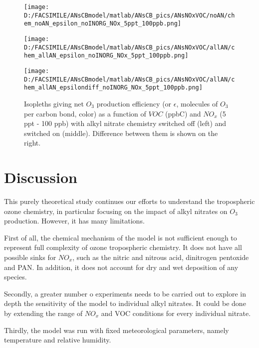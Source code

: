 \documentclass[11pt,a4paper]{article}
\begin{document}
\begin{figure} %
\centering
\begin{minipage}{.3\textwidth}
  \centering
  \texttt{[image: D:/FACSIMILE/ANsCBmodel/matlab/ANsCB\_pics/ANsNOxVOC/noAN/chem\_noAN\_epsilon\_noINORG\_NOx\_5ppt\_100ppb.png]}
\end{minipage}
\begin{minipage}{.3\textwidth}
  \centering
  \texttt{[image: D:/FACSIMILE/ANsCBmodel/matlab/ANsCB\_pics/ANsNOxVOC/allAN/chem\_allAN\_epsilon\_noINORG\_NOx\_5ppt\_100ppb.png]}
\end{minipage}
\begin{minipage}{.3\textwidth}
  \centering
  \texttt{[image: D:/FACSIMILE/ANsCBmodel/matlab/ANsCB\_pics/ANsNOxVOC/allAN/chem\_allAN\_epsilondiff\_noINORG\_NOx\_5ppt\_100ppb.png]}
\end{minipage}
\caption{Isopleths giving net $O_3$ production efficiency (or $\epsilon$, molecules of $O_3$ per carbon bond, color) as a function of $VOC$ (ppbC) and $NO_x$ (5 ppt - 100 ppb) with alkyl nitrate chemistry switched off (left) and switched on (middle). Difference between them is shown on the right.}\label{fig:epsilon5ppt100ppb}
\end{figure}
\section{Discussion} \label{sec:discuss}
This purely theoretical study continues our efforts to understand the tropospheric ozone chemistry, in particular focusing on the impact of alkyl nitrates on $O_3$ production. However, it has many limitations.

First of all, the chemical mechanism of the model is not sufficient enough to represent full complexity of ozone tropospheric chemistry. It does not have all possible sinks for $NO_x$, such as the nitric and nitrous acid, dinitrogen pentoxide and PAN. In addition, it does not account for dry and wet deposition of any species.

Secondly, a greater number o experiments needs to be carried out to explore in depth the sensitivity of the model to individual alkyl nitrates. It could be done by extending the range of $NO_x$ and VOC conditions for every individual nitrate.

Thirdly, the model was run with fixed meteorological parameters, namely temperature and relative humidity.
\end{document}
